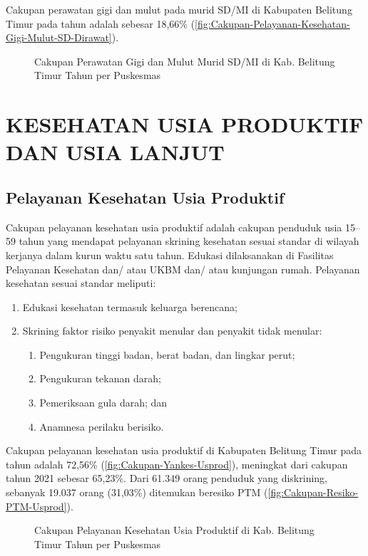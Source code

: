 Cakupan perawatan gigi dan mulut pada murid SD/MI di Kabupaten Belitung Timur pada tahun \tP adalah sebesar 18,66\% (\autoref{fig:Cakupan-Pelayanan-Kesehatan-Gigi-Mulut-SD-Dirawat}).

\begin{figure}[H]
	\centering
	\caption{Cakupan Perawatan Gigi dan Mulut Murid SD/MI di Kab. Belitung Timur Tahun \tP per Puskesmas}
	\label{fig:Cakupan-Pelayanan-Kesehatan-Gigi-Mulut-SD-Dirawat}
\end{figure}

\section[USIPRO DAN USILA]{KESEHATAN USIA PRODUKTIF DAN USIA LANJUT}
\subsection{Pelayanan Kesehatan Usia Produktif}
Cakupan pelayanan kesehatan usia produktif adalah cakupan penduduk usia 15–59 tahun yang mendapat pelayanan skrining kesehatan sesuai standar di wilayah kerjanya dalam kurun waktu satu tahun. Edukasi dilaksanakan di Fasilitas Pelayanan Kesehatan dan/ atau UKBM dan/ atau kunjungan rumah. Pelayanan kesehatan sesuai standar meliputi:
\begin{enumerate}
  \item Edukasi kesehatan termasuk keluarga berencana;
  \item Skrining faktor risiko penyakit menular dan penyakit tidak menular:
  \begin{enumerate}
    \item Pengukuran tinggi badan, berat badan, dan lingkar perut;
    \item Pengukuran tekanan darah;
    \item Pemeriksaan gula darah; dan
    \item Anamnesa perilaku berisiko.
  \end{enumerate}
\end{enumerate}

Cakupan pelayanan kesehatan usia produktif di Kabupaten Belitung Timur pada tahun \tP adalah 72,56\% (\autoref{fig:Cakupan-Yankes-Usprod}), meningkat dari cakupan tahun 2021 sebesar 65,23\%.
Dari 61.349 orang penduduk yang diskrining, sebanyak 19.037 orang (31,03\%) ditemukan beresiko PTM (\autoref{fig:Cakupan-Resiko-PTM-Usprod}).

\begin{figure}[H]
    \centering
    \caption{Cakupan Pelayanan Kesehatan Usia Produktif di Kab. Belitung Timur Tahun \tP per Puskesmas}
    \label{fig:Cakupan-Yankes-Usprod}
\end{figure}

